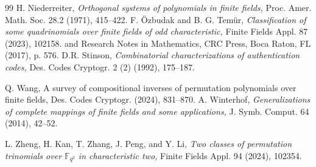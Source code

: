 \documentclass[11pt]{amsart}
\theoremstyle{plain}
\numberwithin{equation}{section}
\def\F{{\mathbb F}}
\begin{document}
\begin{thebibliography}{99}
 H. Niederreiter, {\it Orthogonal systems of polynomials in finite fields,} Proc. Amer. Math. Soc. 28.2 (1971), 415--422.
  F. Özbudak and B. G. Temür, { \it Classification of some quadrinomials over finite fields of odd characteristic,} Finite Fields Appl. 87 (2023), 102158.
and Research Notes in Mathematics, CRC Press, Boca Raton, FL (2017), p. 576.
  D.R. Stinson, {\it Combinatorial characterizations of authentication codes,} Des. Codes Cryptogr. 2 (2) (1992), 175--187.


  Q. Wang, A survey of compositional inverses of permutation polynomials over finite fields, Des. Codes Cryptogr. (2024), 831--870.
   A. Winterhof, {\it Generalizations of complete mappings of finite fields and some applications,} J. Symb. Comput. 64 (2014), 42--52.


 L. Zheng, H. Kan, T. Zhang, J. Peng, and Y. Li, {\it Two classes of permutation trinomials over $\F_{q^3}$ in characteristic two,} Finite Fields Appl. 94 (2024), 102354.
\end{thebibliography}
\end{document}
